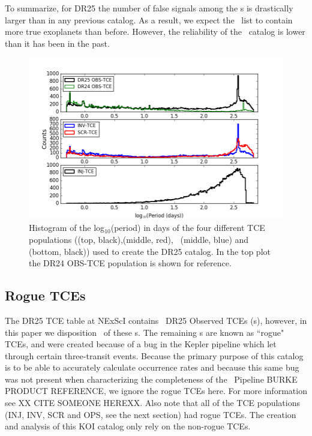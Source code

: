 To summarize, for DR25 the number of false signals among the \opstce s  is drastically larger than in any previous catalog. As a result, we expect the \opstce\ list to contain more true exoplanets than before. However, the reliability of the \opstce\ catalog is lower than it has been in the past.   

\begin{figure}[h!]
 \begin{center}
  \includegraphics[width=1.0\linewidth]{fig-tcePeriods.png}
  \caption{Histogram of the log$_{10}$(period) in days of the four different TCE populations (\opstce (top, black),\scrtce (middle, red), \invtce\ (middle, blue) and \injtce (bottom, black)) used to create the DR25 catalog. In the top plot the DR24 OBS-TCE population is shown for reference.}
  \label{f:tces} 
 \end{center}
 \end{figure}



\subsection{Rogue TCEs}
The DR25 TCE table at NExScI contains \ntces\ DR25 Observed TCEs (\opstce s), however, in this paper we disposition \ntcesnorogue\ of these \opstce s. The remaining \opstce s are known as ``rogue" TCEs, and were created because of a bug in the Kepler pipeline which let through certain three-transit events. Because the primary purpose of this catalog is to be able to accurately calculate occurrence rates and because this same bug was not present when characterizing the completeness of the \Kepler\ Pipeline \citep{}BURKE PRODUCT REFERENCE, we ignore the rogue TCEs here. For more information see XX CITE SOMEONE HEREXX. 
Also note that all of the TCE populations (INJ, INV, SCR and OPS, see the next section) had rogue TCEs. The creation and analysis of this KOI catalog only rely on the non-rogue TCEs.

